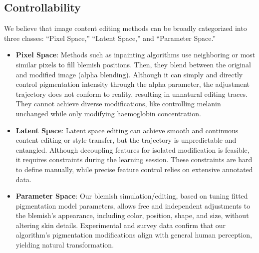 \begin{spacing}{1.5}
\subsection{Controllability}
We believe that image content editing methods can be broadly categorized into three classes: “Pixel Space,” “Latent Space,” and “Parameter Space.”
\begin{itemize}
    \item \textbf{Pixel Space}: Methods such as inpainting algorithms use neighboring or most similar pixels to fill blemish positions\cite{doi:10.1080/10867651.2004.10487596, bertalmio2001navier}. Then, they blend between the original and modified image (alpha blending). Although it can simply and directly control pigmentation intensity through the alpha parameter, the adjustment trajectory does not conform to reality, resulting in unnatural editing traces. They cannot achieve diverse modifications, like controlling melanin unchanged while only modifying haemoglobin concentration.

    \item \textbf{Latent Space}: Latent space editing can achieve smooth and continuous content editing or style transfer, but the trajectory is unpredictable and entangled. Although decoupling features for isolated modification is feasible, it requires constraints during the learning session. These constraints are hard to define manually, while precise feature control relies on extensive annotated data.

    \item \textbf{Parameter Space}: Our blemish simulation/editing, based on tuning fitted pigmentation model parameters, allows free and independent adjustments to the blemish's appearance, including color, position, shape, and size, without altering skin details. Experimental and survey data confirm that our algorithm's pigmentation modifications align with general human perception, yielding natural transformation.
\end{itemize}

\end{spacing}
\newpage
